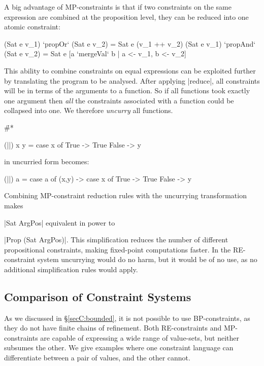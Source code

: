 A big advantage of MP-constraints is that if two constraints on the same expression are combined at the proposition level, they can be reduced into one atomic constraint:

\ignore\begin{code}
(Sat e v_1)  `propOr`   (Sat e v_2) = Sat e (v_1 ++ v_2)
(Sat e v_1)  `propAnd`  (Sat e v_2) = Sat e [a `mergeVal` b | a <- v_1, b <- v_2]
\end{code}

\noindent This ability to combine constraints on equal expressions can be exploited further by translating the program to be analysed. After applying |reduce|, all constraints will be in terms of the arguments to a function. So if all functions took exactly one argument then \textit{all} the constraints associated with a function could be collapsed into one. We therefore \textit{uncurry} all functions.

\begin{example}
\h{#*}\begin{code}
(||) x y = case  x of
                 True   -> True
                 False  -> y
\end{code}

\noindent in uncurried form becomes:

\begin{onepage}
\ignore\begin{code}
(||) a = case  a of
               (x,y) -> case  x of
                              True    -> True
                              False   -> y
\end{code}
\end{onepage}
\end{example}

Combining MP-constraint reduction rules with the uncurrying transformation makes \ignore|Sat ArgPos| equivalent in power to \ignore|Prop (Sat ArgPos)|. This simplification reduces the number of different propositional constraints, making fixed-point computations faster. In the RE-constraint system uncurrying would do no harm, but it would be of no use, as no additional simplification rules would apply.

\subsection{Comparison of Constraint Systems}

As we discussed in \S\ref{secC:bounded}, it is not possible to use BP-constraints, as they do not have finite chains of refinement. Both RE-constraints and MP-constraints are capable of expressing a wide range of value-sets, but neither subsumes the other. We give examples where one constraint language can differentiate between a pair of values, and the other cannot.

